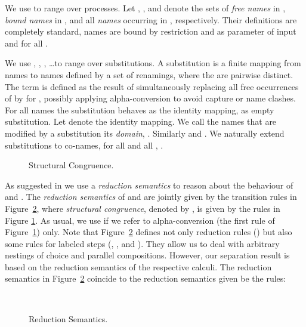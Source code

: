 \documentclass[]{article}
\begin{document}
We use  to range over processes. Let , , and  denote the sets of \emph{free names} in , \emph{bound names} in , and all \emph{names} occurring in , respectively. Their definitions are completely standard, \ie names are bound by restriction and as parameter of input and  for all .

We use , , , \ldots to range over substitutions. A substitution is a finite mapping from names to names defined by a set  of renamings, where the  are pairwise distinct.
The term  is defined as the result of simultaneously replacing all free occurrences of  by  for , possibly applying alpha-conversion to avoid capture or name clashes. For all names  the substitution behaves as the identity mapping, \ie as empty substitution.
Let  denote the identity mapping.
We call the names that are modified by a substitution  its \emph{domain}, \ie . Similarly  and .
We naturally extend substitutions to co-names, \ie for all  and all , .

\begin{figure}[t]
	
	\caption{Structural Congruence.}
	\label{fig:structuralCongruence}
\end{figure}

As suggested in \cite{gorla} we use a \emph{reduction semantics} to reason about the behaviour of \piT and \piNM.
The \emph{reduction semantics} of \piT and \piNM are jointly given by the transition rules in Figure~\ref{fig:reductionSemantics}, where \emph{structural congruence}, denoted by , is given by the rules in Figure \ref{fig:structuralCongruence}. As usual, we use  if we refer to alpha-conversion (the first rule of Figure~\ref{fig:structuralCongruence}) only.
Note that Figure~\ref{fig:reductionSemantics} defines not only reduction rules () but also some rules for labeled steps (, , and ). They allow us to deal with arbitrary nestings of choice and parallel compositions. However, our separation result is based on the reduction semantics of the respective calculi. The reduction semantics in Figure~\ref{fig:reductionSemantics} coincide to the reduction semantics given be the rules:
\begin{center}
	\vspace{0.75em}\\
	\vspace{0.75em}
\end{center}

\begin{figure}[t]
	
	\caption{Reduction Semantics.}
	\label{fig:reductionSemantics}
\end{figure}
\end{document}

